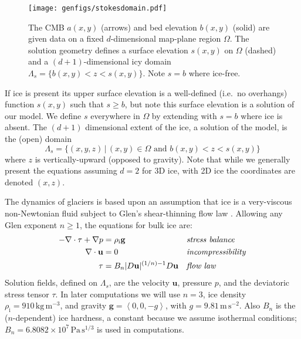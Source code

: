 \documentclass[letterpaper,final,12pt,reqno]{amsart}
\theoremstyle{claim}
\newcommand{\bg}{\mathbf{g}}
\newcommand{\bu}{\mathbf{u}}
\newcommand{\rhoi}{\rho_{\text{i}}}
\numberwithin{equation}{section}
\numberwithin{figure}{section}
\numberwithin{table}{section}
\numberwithin{theorem}{section}
\begin{document}
\begin{figure}[ht]
\begin{center}
\texttt{[image: genfigs/stokesdomain.pdf]}
\end{center}
\caption{The CMB $a(x,y)$ (arrows) and bed elevation $b(x,y)$ (solid) are given data on a fixed $d$-dimensional map-plane region $\Omega$.  The solution geometry defines a surface elevation $s(x,y)$ on $\Omega$ (dashed) and a $(d+1)$-dimensional icy domain $\Lambda_s = \{b(x,y) < z < s(x,y)\}$.  Note $s=b$ where ice-free.}
\label{fig:stokesdomain}
\end{figure}

If ice is present its upper surface elevation is a well-defined (i.e.~no overhangs) function $s(x,y)$ such that $s\ge b$, but note this surface elevation is a solution of our model.  We define $s$ everywhere in $\Omega$ by extending with $s=b$ where ice is absent.  The $(d+1)$ dimensional extent of the ice, a solution of the model, is the (open) domain
\begin{equation}
\Lambda_s = \{(x,y,z)\,|\,(x,y) \in \Omega \text{ and } b(x,y) < z < s(x,y)\} \label{eq:lambdas}
\end{equation}
where $z$ is vertically-upward (opposed to gravity).  Note that while we generally present the equations assuming $d=2$ for 3D ice, with 2D ice the coordinates are denoted $(x,z)$.

The dynamics of glaciers is based upon an assumption that ice is a very-viscous non-Newtonian fluid subject to Glen's shear-thinning flow law \cite{GreveBlatter2009}.  Allowing any Glen exponent $n\ge 1$, the equations \cite[Chapter 1]{FowlerNg2021} for bulk ice are:
\begin{align}
- \nabla \cdot \tau + \nabla p &= \rhoi \bg &&\text{\emph{stress balance}} \label{eq:forcebalance} \\
\nabla \cdot \bu &= 0 &&\text{\emph{incompressibility}} \label{eq:incompressible} \\
\tau &= B_n |D\bu|^{(1/n) - 1} D\bu  &&\text{\emph{flow law}} \label{eq:viscflowlaw}
\end{align}
Solution fields, defined on $\Lambda_s$, are the velocity $\bu$, pressure $p$, and the deviatoric stress tensor $\tau$.  In later computations we will use $n=3$, ice density $\rhoi=910 \,\text{kg}\,\text{m}^{-3}$, and gravity $\bg=\left<0,0,-g\right>$, with $g=9.81\,\text{m}\,\text{s}^{-2}$.  Also $B_n$ is the ($n$-dependent) ice hardness, a constant because we assume isothermal conditions; $B_n=6.8082\times 10^7\,\text{Pa}\,\text{s}^{1/3}$ is used in computations.
\end{document}
